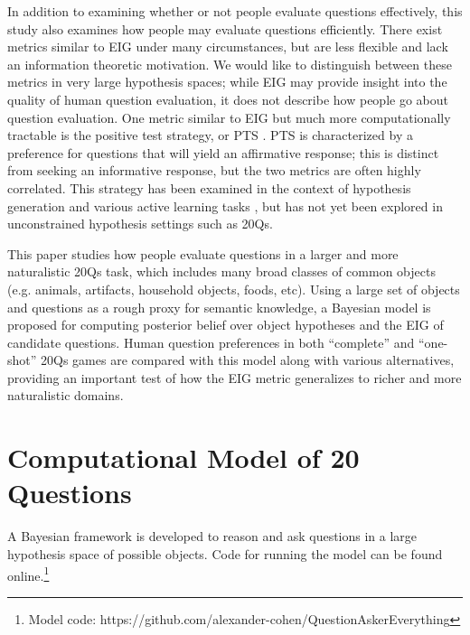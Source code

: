 \documentclass[11pt,letterpaper]{article}
\begin{document}
In addition to examining whether or not people evaluate questions effectively, this study also examines how people may evaluate questions efficiently. There exist metrics similar to EIG under many circumstances, but are less flexible and lack an information theoretic motivation. We would like to distinguish between these metrics in very large hypothesis spaces; while EIG may provide insight into the quality of human question evaluation, it does not describe how people go about question evaluation. One metric similar to EIG but much more computationally tractable is the positive test strategy, or PTS \cite{Nickerson1988, McKenzie2005,Navarro2011,Coenen2015,Gureckis2012}. PTS is characterized by a preference for questions that will yield an affirmative response; this is distinct from seeking an informative response, but the two metrics are often highly correlated. This strategy has been examined in the context of hypothesis generation \cite{Navarro2011} and various active learning tasks \cite{Coenen2015, Gureckis2012,klayman1987confirmation,oaksford1994rational}, but has not yet been explored in unconstrained hypothesis settings such as 20Qs. 



This paper studies how people evaluate questions in a larger and more naturalistic 20Qs task, which includes many broad classes of common objects (e.g. animals, artifacts, household objects, foods, etc).
Using a large set of objects and questions as a rough proxy for semantic knowledge, a Bayesian model is proposed for computing posterior belief over object hypotheses and the EIG of candidate questions.
Human question preferences in both ``complete'' and ``one-shot'' 20Qs games are compared with this model along with various alternatives, providing an important test of how the EIG metric generalizes to richer and more naturalistic domains.

\section* {Computational Model of 20 Questions}
A Bayesian framework is developed to reason and ask questions in a large hypothesis space of possible objects. 
Code for running the model can be found online.\footnote{Model code: https://github.com/alexander-cohen/QuestionAskerEverything}
\end{document}
